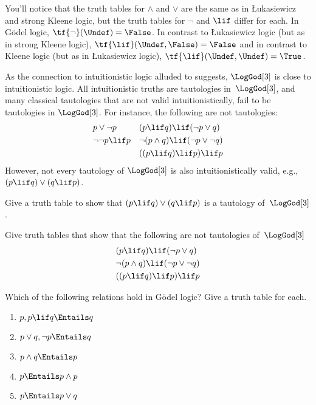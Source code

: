 \documentclass[../../../include/open-logic-section]{subfiles}
\begin{document}
You'll notice that the truth tables for $\land$ and $\lor$ are the
same as in \L ukasiewicz and strong Kleene logic, but the truth tables
for $\lnot$ and $\lif$ differ for each. In G\"odel logic,
$\tf{\lnot}(\Undef) = \False$. In contrast to \L ukasiewicz logic (but
as in strong Kleene logic), $\tf{\lif}(\Undef, \False) = \False$ and
in contrast to Kleene logic (but as in \L ukasiewicz logic),
$\tf{\lif}(\Undef, \Undef) = \True$.

As the connection to intuitionistic logic alluded to suggests,
$\LogGod[3]$ is close to intuitionistic logic. All intuitionistic truths
are tautologies in~$\LogGod[3]$, and many classical tautologies that are
not valid intuitionistically, fail to be tautologies in $\LogGod[3]$.
For instance, the following are not tautologies:
\begin{align*}
  & p \lor \lnot p && (p \lif q) \lif (\lnot p \lor q) \\
  & \lnot\lnot p \lif p && \lnot(p \land q) \lif (\lnot p \lor \lnot q) \\
  &&& ((p \lif q) \lif p) \lif p
\end{align*}
However, not every tautology of $\LogGod[3]$ is also intuitionistically
valid, e.g., $(p \lif q) \lor (q \lif p)$.

\begin{prob}
  Give a truth table to show that $(p \lif q) \lor (q \lif p)$ is a
  tautology of~$\LogGod[3]$.
\end{prob}

\begin{prob}
  Give truth tables that show that the following are not tautologies
  of~$\LogGod[3]$
  \begin{align*}
    & (p \lif q) \lif (\lnot p \lor q) \\
    & \lnot(p \land q) \lif (\lnot p \lor \lnot q) \\
    & ((p \lif q) \lif p) \lif p
  \end{align*}
\end{prob}

\begin{prob}
  Which of the following relations hold in G\"odel logic? Give a truth table for each.
  \begin{enumerate}
    \item $p, p \lif q \Entails q$
    \item $p \lor q, \lnot p \Entails q$
    \item $p \land q \Entails p$
    \item $p \Entails p \land p$
    \item $p \Entails p \lor q$
  \end{enumerate}
\end{prob}
\end{document}
